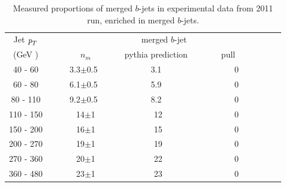 
\begin{table}[!hbt] %
\renewcommand{\arraystretch}{1.2}
\centering
\begin{tabular}{ | c || c | c | c ||}
  \hline
  Jet ${\emph{p}_{T}}$ & \multicolumn{3}{c||}{merged $b$-jet}\\ \cline{2-4}
    (GeV ) & ~~~~~~~$n_m$~~~~~~ & pythia prediction & ~~~~~~pull~~~~~~~~~~\\ \hline
   40 - 60 &  3.3$\pm$0.5  &  3.1  &  0  \\  
   60 - 80 &  6.1$\pm$0.5  &  5.9  &  0  \\ 
   80 - 110&  9.2$\pm$0.5  &  8.2  &  0  \\ 
  110 - 150&  ~14$\pm$1    &  ~12  &  0  \\ 
  150 - 200&  ~16$\pm$1    &  ~15  &  0  \\ 
  200 - 270&  ~19$\pm$1    &  ~19  &  0  \\ 
  270 - 360&  ~20$\pm$1    &  ~22  &  0  \\ 
  360 - 480&  ~23$\pm$1    &  ~23  &  0  \\ \hline
\end{tabular}
\caption{Measured proportions of merged $b$-jets in experimental data from 2011 run, enriched in merged $b$-jets.}
\label{tb:fitfractions2btagM}
\end{table}


